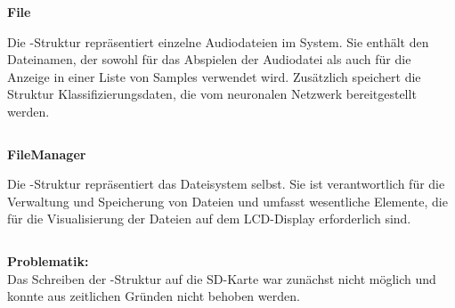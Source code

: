 \vspace{1em}
\textbf{File}
\vspace{1em}

Die -Struktur repräsentiert einzelne Audiodateien im System. Sie enthält den Dateinamen, der sowohl für das Abspielen der Audiodatei als auch für die Anzeige in einer Liste von Samples verwendet wird. Zusätzlich speichert die Struktur Klassifizierungsdaten, die vom neuronalen Netzwerk bereitgestellt werden.


 \inputminted[firstline=37, lastline=41]{c}{../../f401_display_encoder_fader_test/Core/Inc/filemanager.h}
 
\vspace{1em}
\textbf{FileManager}
\vspace{1em}

Die -Struktur repräsentiert das Dateisystem selbst. Sie ist verantwortlich für die Verwaltung und Speicherung von Dateien und umfasst wesentliche Elemente, die für die Visualisierung der Dateien auf dem LCD-Display erforderlich sind.
 
 \inputminted[firstline=49, lastline=58]{c}{../../f401_display_encoder_fader_test/Core/Inc/filemanager.h}
 
\vspace{1em} 
\textbf{Problematik:} \\



Das Schreiben der -Struktur auf die SD-Karte war zunächst nicht möglich und konnte aus zeitlichen Gründen nicht behoben werden.



